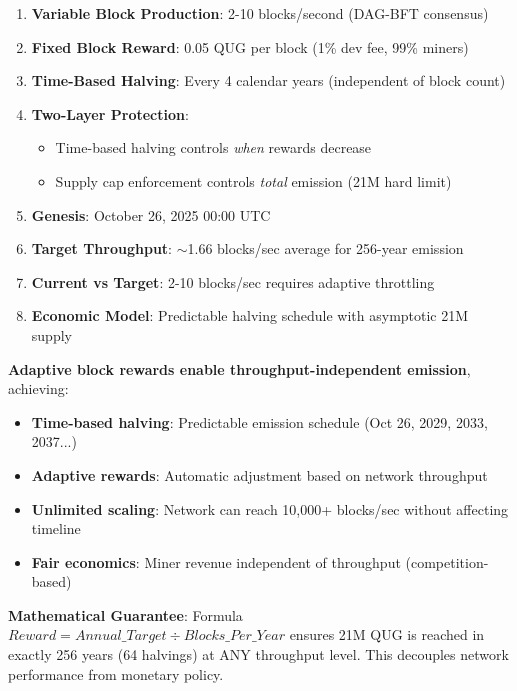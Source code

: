 \documentclass[11pt,a4paper]{article}
\begin{document}
\begin{enumerate}
    \item \textbf{Variable Block Production}: 2-10 blocks/second (DAG-BFT consensus)
    \item \textbf{Fixed Block Reward}: 0.05 QUG per block (1\% dev fee, 99\% miners)
    \item \textbf{Time-Based Halving}: Every 4 calendar years (independent of block count)
    \item \textbf{Two-Layer Protection}:
    \begin{itemize}
        \item Time-based halving controls \textit{when} rewards decrease
        \item Supply cap enforcement controls \textit{total} emission (21M hard limit)
    \end{itemize}
    \item \textbf{Genesis}: October 26, 2025 00:00 UTC
    \item \textbf{Target Throughput}: $\sim$1.66 blocks/sec average for 256-year emission
    \item \textbf{Current vs Target}: 2-10 blocks/sec requires adaptive throttling
    \item \textbf{Economic Model}: Predictable halving schedule with asymptotic 21M supply
\end{enumerate}

\vspace{0.5cm}

\begin{tcolorbox}[colback=primarycolor!10, colframe=primarycolor, title=Core Innovation]
\textbf{Adaptive block rewards enable throughput-independent emission}, achieving:
\begin{itemize}
    \item \textbf{Time-based halving}: Predictable emission schedule (Oct 26, 2029, 2033, 2037...)
    \item \textbf{Adaptive rewards}: Automatic adjustment based on network throughput
    \item \textbf{Unlimited scaling}: Network can reach 10,000+ blocks/sec without affecting timeline
    \item \textbf{Fair economics}: Miner revenue independent of throughput (competition-based)
\end{itemize}

\textbf{Mathematical Guarantee}: Formula $Reward = Annual\_Target \div Blocks\_Per\_Year$ ensures 21M QUG is reached in exactly 256 years (64 halvings) at ANY throughput level. This decouples network performance from monetary policy.
\end{tcolorbox}
\end{document}
